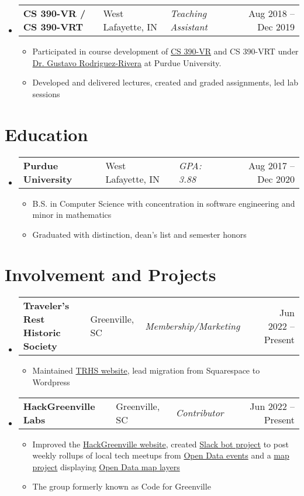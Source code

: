 \documentclass[11pt]{extarticle}
\makeatletter
\newcommand{\entry}[5]{
	\begin{tabularx}{\linewidth}{l@{, }l@{ – }lXr}
			\textbf{#1} & #2 & \lighttext \textit{#3} & & #4 – #5
	\end{tabularx}
	\vspace{-16pt}
}
\newcommand{\sectiontitle}[1]{
	\section*{\sectiontext #1}
	\vspace{-2pt}
}
\makeatother
\begin{document}
\begin{itemize}[leftmargin=1em]
	\item[]
	\entry{CS 390-VR / CS 390-VRT}{West Lafayette, IN}{Teaching Assistant}{Aug 2018}{Dec 2019}
	\begin{itemize}
		\item Participated in course development of
		\href{https://www.cs.purdue.edu/homes/cs390vr/}{CS 390-VR} and CS 390-VRT
		under \href{https://www.cs.purdue.edu/people/faculty/grr}{Dr. Gustavo
		Rodriguez-Rivera} at Purdue University.
		\item Developed and delivered lectures, created and graded assignments, led
		lab sessions
	\end{itemize}
\end{itemize}
\vspace{-20pt}

\sectiontitle{Education}
\begin{itemize}[leftmargin=1em]
	\item[]
	\entry{Purdue University}{West Lafayette, IN}{GPA: 3.88}{Aug 2017}{Dec 2020}
	\begin{itemize}
		\item B.S. in Computer Science with concentration in software engineering
		and minor in mathematics
		\item Graduated with distinction, dean's list and semester honors
	\end{itemize}
\end{itemize}
\vspace{-20pt}

\sectiontitle{Involvement and Projects}
\begin{itemize}[leftmargin=1em]
	\item[]
	\entry{Traveler's Rest Historic Society}{Greenville, SC}{Membership/Marketing}{Jun 2022}{Present}
	\begin{itemize}
		\item Maintained \href{https://travelersresthistoricalsociety.org}{TRHS
		website}, lead migration from Squarespace to Wordpress
	\end{itemize}

	\item[]
	\entry{HackGreenville Labs}{Greenville, SC}{Contributor}{Jun 2022}{Present}
	\begin{itemize}
		\item Improved the \href{https://hackgreenville.com/}{HackGreenville
			website}, created
			\href{https://github.com/hackgvl/slack-events-bot}{Slack bot project}
			to post weekly rollups of local tech meetups from
			\href{https://github.com/hackgvl/OpenData}{Open Data events}
			and a
			\href{https://github.com/hackgvl/open-map-data-multi-layers-demo}{map
			project} displaying
			\href{https://github.com/hackgvl/OpenData}{Open Data map layers}
		\item The group formerly known as Code for Greenville
	\end{itemize}
\end{itemize}
\vspace{-20pt}
\end{document}
